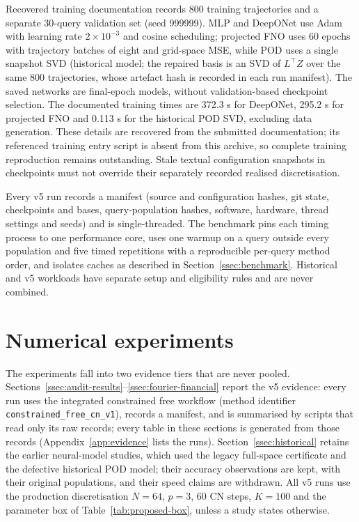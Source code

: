 \documentclass[11pt]{amsart}
\theoremstyle{remark}
\begin{document}
Recovered training documentation records 800 training trajectories and a
separate 30-query validation set (seed 999999). MLP and DeepONet use Adam
with learning rate $2\times10^{-3}$ and cosine scheduling; projected FNO uses
60 epochs with trajectory batches of eight and grid-space MSE, while POD
uses a single snapshot SVD (historical model; the repaired basis is an SVD
of $L^\top Z$ over the same 800 trajectories, whose artefact hash is
recorded in each run manifest). The saved networks are final-epoch models,
without validation-based checkpoint selection. The documented training
times are 372.3 s for DeepONet, 295.2 s for projected FNO and 0.113 s for
the historical POD SVD, excluding data generation. These details are recovered from the
submitted documentation; its referenced training entry script is absent
from this archive, so complete training reproduction remains outstanding.
Stale textual configuration snapshots in checkpoints must not override their
separately recorded realised discretisation.

Every v5 run records a manifest (source and configuration hashes, git state,
checkpoints and bases, query-population hashes, software, hardware, thread
settings and seeds) and is single-threaded. The benchmark pins each timing
process to one performance core, uses one warmup on a query outside every
population and five timed repetitions with a reproducible per-query method
order, and isolates caches as described in Section~\ref{ssec:benchmark}.
Historical and v5 workloads have separate setup and eligibility rules and are
never combined.


\section{Numerical experiments}
\label{sec:numerics}

The experiments fall into two evidence tiers that are never pooled.
Sections~\ref{ssec:audit-results}--\ref{ssec:fourier-financial} report the
v5 evidence: every run uses the integrated constrained free workflow
(method identifier \texttt{constrained\_free\_cn\_v1}), records a manifest,
and is summarised by scripts that read only its raw records; every table in
these sections is generated from those records
(Appendix~\ref{app:evidence} lists the runs). Section~\ref{ssec:historical}
retains the earlier neural-model studies, which used the legacy full-space
certificate and the defective historical POD model; their accuracy
observations are kept, with their original populations, and their speed
claims are withdrawn. All v5 runs use the production discretisation
$N=64$, $p=3$, $60$ CN steps, $K=100$ and the parameter box of
Table~\ref{tab:proposed-box}, unless a study states otherwise.
\end{document}
